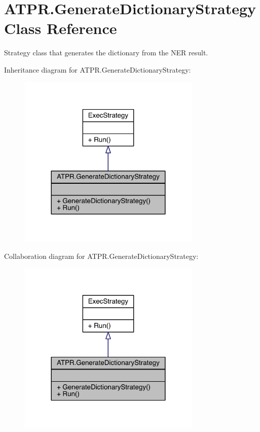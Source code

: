 \hypertarget{class_a_t_p_r_1_1_generate_dictionary_strategy}{}\section{A\+T\+P\+R.\+Generate\+Dictionary\+Strategy Class Reference}
\label{class_a_t_p_r_1_1_generate_dictionary_strategy}


Strategy class that generates the dictionary from the N\+ER result.  




Inheritance diagram for A\+T\+P\+R.\+Generate\+Dictionary\+Strategy\+:
\nopagebreak
\begin{figure}[H]
\begin{center}
\leavevmode
\includegraphics[width=248pt]{d2/d87/class_a_t_p_r_1_1_generate_dictionary_strategy__inherit__graph}
\end{center}
\end{figure}


Collaboration diagram for A\+T\+P\+R.\+Generate\+Dictionary\+Strategy\+:
\nopagebreak
\begin{figure}[H]
\begin{center}
\leavevmode
\includegraphics[width=248pt]{de/da4/class_a_t_p_r_1_1_generate_dictionary_strategy__coll__graph}
\end{center}
\end{figure}
